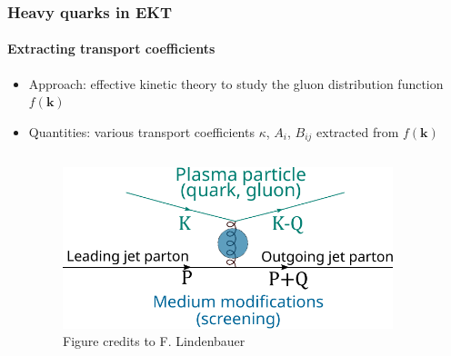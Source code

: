 \documentclass[aspectratio=169,11pt,usenames,dvipsnames]{beamer}
\begin{document}

\begin{frame}
    \frametitle{Heavy quarks in EKT}
    \framesubtitle{Extracting transport coefficients}
        \vspace{10pt} 
        \begin{itemize}
            \item \begin{center}{{\color{ming}Approach}: {\color{ming}effective kinetic theory} to study the gluon distribution function $f(\boldsymbol{k})$} \end{center}
            \item \begin{center}{{\color{pinky}Quantities}: various transport coefficients {\color{pinky}$\kappa$}, {\color{pinky}$A_i$}, {\color{pinky}$B_{ij}$} extracted from $f(\boldsymbol{k})$} \end{center}
        \end{itemize} 
        \begin{columns}
            \begin{column}{0.066\textwidth}\end{column}
            \begin{column}{0.35\textwidth}
                \centering
                \begin{figure}
                    \centering
                    \captionsetup{justification=centering}
                    \includegraphics[width=0.9\textwidth]{images/feynmandiag_wo_title.pdf}
                    \caption{\scriptsize Figure credits to F. Lindenbauer}
                \end{figure}

\end{column}
\end{columns}
\end{frame}
\end{document}
